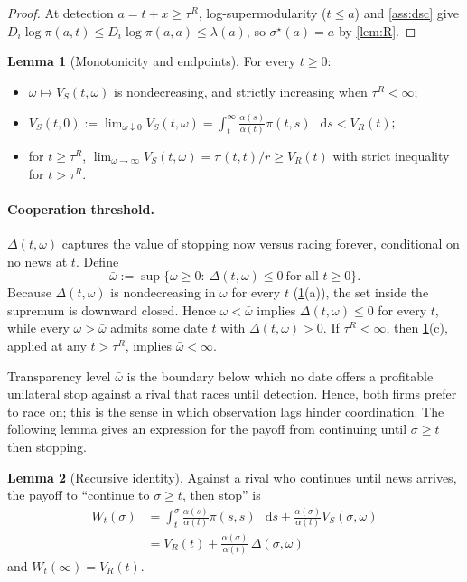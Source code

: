 \documentclass[12pt,reqno]{article}
\newcommand{\de}{\mathop{}\!\mathrm{d}}
\theoremstyle{definition} \newtheorem{example}{Example}
\theoremstyle{definition} \newtheorem{condition}{Condition}
\theoremstyle{definition} \newtheorem{corollary}{Corollary}
\theoremstyle{definition} \newtheorem{claim}{Claim}
\theoremstyle{definition} \newtheorem{definition}{Definition}
\theoremstyle{definition} \newtheorem{conjecture}{Conjecture}
\theoremstyle{definition} \newtheorem{Lemma}{Lemma}
\theoremstyle{definition} \newtheorem{lemma}{Lemma}
\theoremstyle{plain} \newtheorem{theorem}{Theorem}
\theoremstyle{definition} \newtheorem{assumption}{Assumption}
\theoremstyle{definition} \newtheorem*{assumptionnonumber}{Assumption}
\theoremstyle{definition} \newtheorem*{theoremNoNumber}{Proposition}
\theoremstyle{definition}
\theoremstyle{definition}\newtheorem{proposition}{Proposition}
\theoremstyle{definition} \newtheorem{result}{Result}
\theoremstyle{definition} \newtheorem*{definitionNoNumber}{Definition}
\theoremstyle{definition} \newtheorem{Definition}{Definition}
\theoremstyle{definition} \newtheorem*{DefinitionNoNumber}{Definition}
\theoremstyle{definition} \newtheorem*{fact}{Fact}
\theoremstyle{definition} \newtheorem*{property}{Property}
\theoremstyle{definition} \newtheorem{remark}{Remark}
\begin{document}
\begin{proof}
At detection $a=t+x\ge\tau^R$, log-supermodularity ($t\le a$) and \cref{ass:dsc} give $D_i\log\pi(a,t)\le D_i\log\pi(a,a)\le\lambda(a)$, so $\sigma^\star(a)=a$ by \cref{lem:R}. 
\end{proof}

\begin{lemma}[Monotonicity and endpoints]\label{lem:mono}
For every $t\ge0$:
\begin{itemize}
\item[(a)] $\omega\mapsto V_S(t,\omega)$ is nondecreasing, and strictly increasing when $\tau^R<\infty$;
\item[(b)] $V_S(t,0):=\lim_{\omega\downarrow0}V_S(t,\omega)=\int_t^\infty\frac{\alpha(s)}{\alpha(t)}\pi(t,s)\,\de s<V_R(t)$;
\item[(c)] for $t\ge\tau^R$, $\lim_{\omega\to\infty}V_S(t,\omega)=\pi(t,t)/r\ge V_R(t)$ with strict inequality for $t>\tau^R$.
\end{itemize}
\end{lemma}


%




\paragraph{Cooperation threshold.} $\Delta(t,\omega)$ captures the value  of stopping now versus racing forever, conditional on no news at $t$.  Define
\[
\bar\omega:=\sup\Big\{\omega\ge0:\ \Delta(t,\omega)\le0\ \text{for all }t\ge0\Big\}.
\]
Because $\Delta(t,\omega)$ is nondecreasing in $\omega$ for every $t$ (\cref{lem:mono}(a)), the set inside the supremum is downward closed. Hence $\omega<\bar\omega$ implies $\Delta(t,\omega)\le0$ for every $t$, while every $\omega>\bar\omega$ admits some date $t$ with $\Delta(t,\omega)>0$. If $\tau^R<\infty$, then \cref{lem:mono}(c), applied at any $t>\tau^R$, implies $\bar\omega<\infty$.




Transparency level $\bar\omega$ is the boundary below which no date offers a profitable unilateral stop against a rival that races until detection. Hence, both firms prefer to race on; this is the sense in which observation lags hinder coordination. The following lemma gives an expression for the payoff from continuing until $\sigma \geq t$ then stopping. 


\begin{lemma}[Recursive identity]\label{lem:rec}
Against a rival who continues until news arrives, the payoff to ``continue to $\sigma\ge t$, then stop'' is
\begin{align*}
    W_t(\sigma)&=\int_t^\sigma\frac{\alpha(s)}{\alpha(t)}\pi(s,s)\,\de s+\frac{\alpha(\sigma)}{\alpha(t)}V_S(\sigma,\omega) \\
&=V_R(t)+\frac{\alpha(\sigma)}{\alpha(t)}\,\Delta(\sigma,\omega)
\end{align*}
and $W_t(\infty)=V_R(t)$.
\end{lemma}
\end{document}
